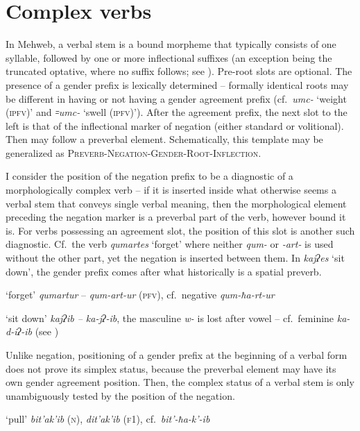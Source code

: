\documentclass[output=paper]{langsci/langscibook}
\begin{document}
\section{Complex verbs}\label{complex-verbs}


In Mehweb, a verbal stem is a bound morpheme that typically consists of
one syllable, followed by one or more inflectional suffixes (an exception
being the truncated optative, where no suffix follows; see \citealt{dobrushina2019}).
Pre-root slots are optional. The presence of a gender prefix is
lexically determined – formally identical roots may be different in
having or not having a gender agreement prefix (cf.\ \emph{umc-} `weight
(\textsc{ipfv})' and \emph{꞊umc-} `swell (\textsc{ipfv})'). After the agreement prefix,
the next slot to the left is that of the inflectional marker of {negation}
(either standard or volitional). Then may follow a preverbal element.
Schematically, this template may be generalized as
\textsc{Preverb}-\textsc{Negation}-\textsc{Gender}-\textsc{Root}-\textsc{Inflection}.

I consider the position of the negation prefix to be a diagnostic of a
morphologically complex verb – if it is inserted inside what otherwise
seems a verbal stem that conveys single verbal meaning, then the
morphological element preceding the negation marker is a preverbal part
of the verb, however bound it is. For verbs possessing an agreement
slot, the position of this slot is another such diagnostic. Cf.\ the verb
\emph{qumartes} `forget' where neither \emph{qum-} or \emph{-art-} is
used without the other part, yet the negation is inserted between them.
In \emph{kajʔes} `sit down', the gender prefix comes after what
historically is a spatial preverb.

\ea %
`forget' \emph{qumartur} – \emph{qum-art-ur} (\textsc{pfv}), cf.\ negative \emph{qum-ħa-rt-ur}

\ex %
`sit down' \emph{kajʔib – ka-jʔ-ib}, the masculine \emph{w-} is
lost after vowel – cf.\ feminine \emph{ka-d-iʔ-ib} (see )
\z

Unlike negation, positioning of a gender prefix at the beginning of a
verbal form does not prove its simplex status, because the preverbal
element may have its own gender agreement position. Then, the complex
status of a verbal stem is only unambiguously tested by the position of
the negation.

\ea %
`pull' \emph{bit'ak'ib} (\textsc{n}), \emph{dit'ak'ib} (\textsc{f1}), cf.\ \emph{bit'-ħa-k'-ib}
\z
\end{document}
